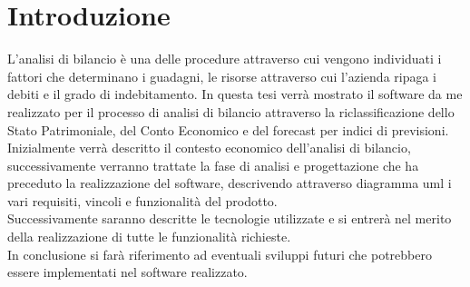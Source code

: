 \chapter*{Introduzione}

L'analisi di bilancio è una delle procedure attraverso cui vengono individuati i fattori che determinano i guadagni, le risorse attraverso cui l'azienda ripaga i debiti e il grado di indebitamento.
In questa tesi verrà mostrato il software da me realizzato per il processo di analisi di bilancio attraverso la riclassificazione dello Stato Patrimoniale, del Conto Economico e del forecast per indici di previsioni.\\
Inizialmente verrà descritto il contesto economico dell'analisi di bilancio, successivamente verranno trattate la fase di analisi e progettazione che ha preceduto la realizzazione del software, descrivendo attraverso diagramma \Gls{uml} \cite{uml} i vari requisiti, vincoli e funzionalità del prodotto. \\
Successivamente saranno descritte le tecnologie utilizzate e si entrerà nel merito della realizzazione di tutte le funzionalità richieste. \\
In conclusione si farà riferimento ad eventuali sviluppi futuri che potrebbero essere implementati nel software realizzato.